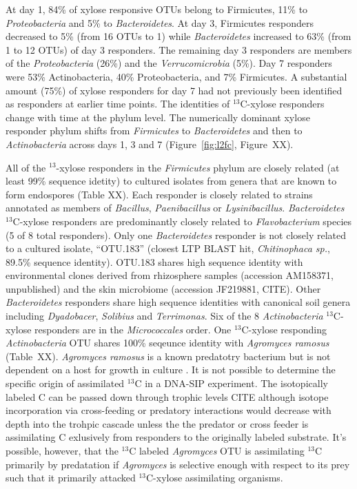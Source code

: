 At day 1, 84\% of xylose responsive OTUs belong to Firmicutes, 11\% to
\textit{Proteobacteria} and 5\% to \textit{Bacteroidetes}. At day 3,
Firmicutes responders decreased to 5\% (from 16 OTUs to 1) while
\textit{Bacteroidetes} increased to 63\% (from 1 to 12 OTUs) of day 3
responders. The remaining day 3 responders are members of the
\textit{Proteobacteria} (26\%) and the \textit{Verrucomicrobia} (5\%). Day 7
responders were 53\% Actinobacteria, 40\% Proteobacteria, and 7\% Firmicutes. A
substantial amount (75\%) of xylose responders for day 7 had not previously
been identified as responders at earlier time points. The identities of $^{13}$C-xylose
responders change with time at the phylum level. The numerically dominant xylose
responder phylum shifts from \textit{Firmicutes} to \textit{Bacteroidetes} and
then to \textit{Actinobacteria} across days 1, 3 and 7 (Figure~\ref{fig:l2fc},
Figure~XX). 

All of the $^{13}$-xylose responders in the \textit{Firmicutes} phylum are
closely related (at least 99\% sequence idetity) to cultured isolates from
genera that are known to form endospores (Table XX). Each responder is closely
related to strains annotated as members of \textit{Bacillus},
\textit{Paenibacillus} or \textit{Lysinibacillus}. \textit{Bacteroidetes}
$^{13}$C-xylose responders are predominantly closely related to
\textit{Flavobacterium} species (5 of 8 total responders). Only one
\textit{Bacteroidetes} responder is not closely related to a cultured isolate,
``OTU.183'' (closest LTP BLAST hit, \textit{Chitinophaca sp.}, 89.5\% sequence
identity). OTU.183 shares high sequence identity with environmental clones
derived from rhizosphere samples (accession AM158371, unpublished) and the skin
microbiome (accession JF219881, CITE). Other \textit{Bacteroidetes} responders
share high sequence identities with canonical soil genera including
\textit{Dyadobacer}, \textit{Solibius} and \textit{Terrimonas}. Six of the 8
\textit{Actinobacteria} $^{13}$C-xylose responders are in the
\textit{Micrococcales} order. One $^{13}$C-xylose responding
\textit{Actinobacteria} OTU shares 100\% seqeunce identity with
\textit{Agromyces ramosus} (Table~XX).  \textit{Agromyces ramosus} is a known
predatotry bacterium but is not dependent on a host for growth in culture
\citep{16346402}. It is not possible to determine the specific origin of assimilated
$^{13}$C in a DNA-SIP experiment. The isotopically labeled C can be passed down
through trophic levels CITE although isotope incorporation via cross-feeding or predatory
interactions would decrease with depth into the trohpic cascade unless the the predator or 
cross feeder is assimilating C exlusively from responders to the originally labeled substrate. It's possible, however, that the $^{13}$C labeled
\textit{Agromyces} OTU is assimilating $^{13}$C primarily by predatation if \textit{Agromyces} is selective enough with respect to its prey such that it primarily attacked $^{13}$C-xylose assimilating organisms.

